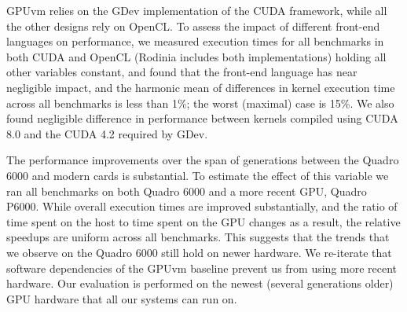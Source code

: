  GPUvm relies on the GDev implementation of the
CUDA framework, while all the other designs rely on OpenCL. To assess the
impact of different front-end languages on performance, we measured execution
times for all benchmarks in both CUDA and OpenCL (Rodinia includes both
implementations) holding all other variables constant, and found that the
front-end language has near negligible impact, and the harmonic mean of
differences in kernel execution time across all benchmarks is less than 1\%;
the worst (maximal) case is 15\%. We also found negligible difference in
performance between kernels compiled using CUDA 8.0 and the CUDA 4.2 required
by GDev.

 The performance improvements over the
span of generations between the Quadro 6000 and modern cards is substantial.
To estimate the effect of this variable we ran all benchmarks on both Quadro
6000 and a more recent GPU, Quadro P6000. While overall execution times are
improved substantially, and the ratio of time spent on the host to time spent
on the GPU changes as a result, the relative speedups are uniform across all
benchmarks. This suggests that the trends that we observe on the Quadro 6000
still hold on newer hardware. We re-iterate that software dependencies of the
GPUvm baseline prevent us from using more recent hardware. Our evaluation is
performed on the newest (several generations older) GPU hardware that all our
systems can run on.